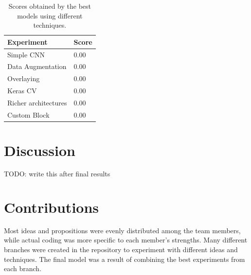 \documentclass[11pt]{article}
\begin{document}
\begin{multicols}{2}
      \label{tab:results}
      \begin{table}[H]
          \centering
          \setlength{\tabcolsep}{3pt}
          \caption{Scores obtained by the best models using different techniques.}
          \begin{tabularx}{\linewidth}{lY}
              \toprule
              Experiment & Score \\
              \midrule
              Simple CNN & 0.00 \\
              Data Augmentation & 0.00 \\
              Overlaying & 0.00 \\
              Keras CV & 0.00 \\
              Richer architectures & 0.00 \\
              Custom Block & 0.00 \\
              \bottomrule
          \end{tabularx}
          \label{tb:Measurements}
      \end{table}

      \section{Discussion}

      TODO: write this after final results

      \section{Contributions}

      Most ideas and propositions were evenly distributed among the team
      members, while actual coding was more specific to each member's
      strengths. Many different branches were created in the repository to
      experiment with different ideas and techniques. The final model was a
      result of combining the best experiments from each branch.


\end{multicols}
\end{document}
